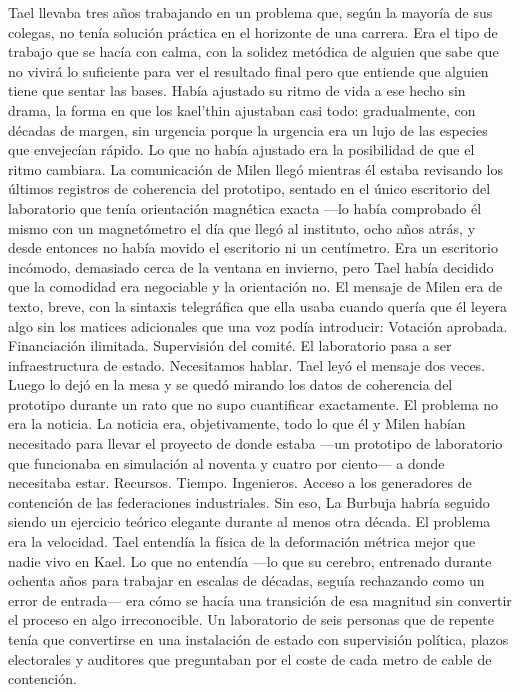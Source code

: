 \documentclass[11pt,a5paper,twoside]{book}
\begin{document}
Tael llevaba tres años trabajando en un problema que, según la mayoría de sus colegas, no tenía solución práctica en el horizonte de una carrera. Era el tipo de trabajo que se hacía con calma, con la solidez metódica de alguien que sabe que no vivirá lo suficiente para ver el resultado final pero que entiende que alguien tiene que sentar las bases. Había ajustado su ritmo de vida a ese hecho sin drama, la forma en que los kael'thin ajustaban casi todo: gradualmente, con décadas de margen, sin urgencia porque la urgencia era un lujo de las especies que envejecían rápido.
Lo que no había ajustado era la posibilidad de que el ritmo cambiara.
La comunicación de Milen llegó mientras él estaba revisando los últimos registros de coherencia del prototipo, sentado en el único escritorio del laboratorio que tenía orientación magnética exacta —lo había comprobado él mismo con un magnetómetro el día que llegó al instituto, ocho años atrás, y desde entonces no había movido el escritorio ni un centímetro. Era un escritorio incómodo, demasiado cerca de la ventana en invierno, pero Tael había decidido que la comodidad era negociable y la orientación no.
El mensaje de Milen era de texto, breve, con la sintaxis telegráfica que ella usaba cuando quería que él leyera algo sin los matices adicionales que una voz podía introducir: Votación aprobada. Financiación ilimitada. Supervisión del comité. El laboratorio pasa a ser infraestructura de estado. Necesitamos hablar.
Tael leyó el mensaje dos veces.
Luego lo dejó en la mesa y se quedó mirando los datos de coherencia del prototipo durante un rato que no supo cuantificar exactamente.
El problema no era la noticia. La noticia era, objetivamente, todo lo que él y Milen habían necesitado para llevar el proyecto de donde estaba —un prototipo de laboratorio que funcionaba en simulación al noventa y cuatro por ciento— a donde necesitaba estar. Recursos. Tiempo. Ingenieros. Acceso a los generadores de contención de las federaciones industriales. Sin eso, La Burbuja habría seguido siendo un ejercicio teórico elegante durante al menos otra década.
El problema era la velocidad.
Tael entendía la física de la deformación métrica mejor que nadie vivo en Kael. Lo que no entendía —lo que su cerebro, entrenado durante ochenta años para trabajar en escalas de décadas, seguía rechazando como un error de entrada— era cómo se hacía una transición de esa magnitud sin convertir el proceso en algo irreconocible. Un laboratorio de seis personas que de repente tenía que convertirse en una instalación de estado con supervisión política, plazos electorales y auditores que preguntaban por el coste de cada metro de cable de contención.
\end{document}
